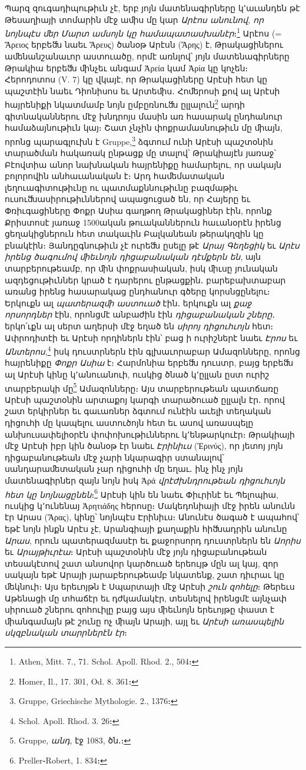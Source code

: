 \documentclass{article}
\begin{document}
{Պարզ զուգադիպութիւն չէ, երբ յոյն մատենագիրները կ՚աւանդեն թէ Թեսաղիայի տոմարին մէջ աﬕս մը կար \emph{Արէոս անունով, որ նոյնպէս ﬔր Մարտ ամսոյն կը համապատասխանէր}։\footnote{Athen, Mitt. 7., 71. Schol. Apoll. Rhod. 2., 504։} Արէոս (= Ἄρειος երբեﬓ նաեւ Ἄρευς) ծանօթ Արէսն (Ἄρης) է, Թրակացիներու աﬔնանշանաւոր աստուածը, որմէ առնլով՝ յոյն մատենագիրները Թրակիա երբեﬓ ﬕնչեւ անգամ Ἀρεία կամ Ἀρία կը կոչեն։ Հերոդոտոս (V. 7) կը վկայէ, որ Թրակացիները Արէսի հետ կը պաշտէին նաեւ Դիոնիսոս եւ Արտեﬕս․ Հոﬔրոսի քով ալ Արէսի հայրենիքի նկատմամբ նոյն ըմբըռնուﬓ ըլլալուն\footnote{Homer, Il., 17. 301, Od. 8. 361։} արդի գիտնականներու մէջ խնդրոյս մասին առ հասարակ ընդհանուր համաձայնութիւն կայ։ Շատ չնչին փոքրամասնութիւն մը ﬕայն, որոնց պարագլուխն է Gruppe,\footnote{Gruppe, Griechische Mythologie. 2., 1376։} ձգտում ունի Արէսի պաշտօնին տարածման հակառակ ընթացք մը տալով՝ Թրակիայէն յառաջ՝ Բէովտիա անոր նախնական հայրենիքը համարելու, որ սակայն բոլորովին անհաւանական է։ Արդ հաﬔմատական լեղուագիտութիւնը ու պատմաքննութիւնը բազմաթիւ ուսուﬓասիրութիւններով ապացուցած են, որ Հայերը եւ Փռիւգացիները Փոքր Ասիա գաղթող Թրակացիներ էին, որոնք Քրիստոսէ յառաջ 1500ական թուականներուն հաւանօրէն իրենց ցեղակիցներուն հետ տակաւին Բալկանեան թերակղզին կը բնակէին։ Յանդըգնութիւն չէ ուրեﬓ ըսելը թէ \emph{Արայ Գեղեցիկ} եւ \emph{Արէս իրենց ծագումով ﬕեւնոյն դիցաբանական դէմքերն են}, այն տարբերութեամբ, որ ﬕն փոքրասիական, իսկ ﬕւսը յունական ազդեցութիւններ կրած է դարերու ընթացքին․ բարեբախտաբար առանց իրենց հասարակաց ընդհանուր գծերը կորսնցընելու։ Երկուքն ալ \emph{պատերազﬕ աստուած} էին․ երկուքն ալ \emph{քաջ որսորդներ} էին, որոնցմէ անբաժին էին \emph{դիցաբանական շները}․ երկո՛ւքն ալ սերտ աղերսի մէջ եղած են \emph{սիրոյ դիցուհւոյն} հետ։ Ափրոդիտէի եւ Արէսի որդիներն էին՝ բաց ի ուրիշներէ նաեւ \emph{Էրոս} եւ \emph{Անտերոս},\footnote{Schol. Apoll. Rhod. 3. 26։} իսկ դուստրներն էին գլխաւորաբար Ամազոնները, որոնց հայրենիքը \emph{Փոքր Ասիա} է։ Հարմոնիա երբեﬓ դուստր, բայց երբեﬓ ալ Արէսի կինը կ՚անուանուի, ուսկից ծնած կ՚ըլլան ըստ ուրիշ տարբերակի մը\footnote{Gruppe, \emph{անդ}, էջ 1083, ծն․։} Ամազոնները։ Այս տարբերութեան պատճառը Արէսի պաշտօնին արտաքոյ կարգի տարածուած ըլլալն էր․ որով շատ երկիրներ եւ գաւառներ ձգտում ունէին աւելի տեղական դիցուհի մը կապելու աստուծոյն հետ եւ ասով առասպելը անխուսափելիօրէն փոփոխութիւններու կ՚ենթարկուէր։ Թրակիայի մէջ Արէսի իբր կին ծանօթ էր նաեւ \emph{Էրինիւս} (Ἐρινύς), որ յետոյ յոյն դիցաբանութեան մէջ չարի նկարագիր ստանալով՝ սանդարաﬔտական չար դիցուհի մը եղաւ․ ինչ ինչ յոյն մատենագիրներ զայն նոյն իսկ Ἀρά \emph{վրէժխնդրութեան դիցուհւոյն հետ կը նոյնացընեն}։\footnote{Preller֊Robert, 1. 834։} Արէսի կին են նաեւ Փիւրինէ եւ Պելոպիա, ուսկից կ՚ունենայ Ἀρητιάδης հերոսը։ Մակեդոնիայի մէջ իրեն անունն էր Արաս (Ἄρας), կինը՝ նոյնպէս Էրինիւս։ Անունէս ծագած է ապահով՝ եթէ նոյն ինքն Արէս չէ, Արանգիայի քաղաքին հիﬓադրին անունը \emph{Արաս}, որուն պատերազմասէր եւ քաջորսորդ դուստրներն են \emph{Աորիս} եւ \emph{Արայթիւրէա}։ Արէսի պաշտօնին մէջ յոյն դիցաբանութեան տեսակէտով շատ անսովոր կարծուած երեույթ մըն ալ կայ, զոր սակայն եթէ Արայի յարաբերութեամբ նկատենք, շատ դիւրաւ կը ﬔկնուի։ Այս երեւոյթն է Սպարտայի մէջ Արէսի \emph{շուն զոհելը}։ Թերեւս Աթենացի մը տհաճէր եւ դժկամակէր, տեսնելով իրենցմէ այնչափ սիրուած շներու զոհուիլը բայց այս ﬕեւնոյն երեւոյթը փաստ է ﬕանգամայն թէ շունը ոչ ﬕայն Արայի, այլ եւ \emph{Արէսի առասպելին սկզբնական տարրներէն էր}։

}
\end{document}
